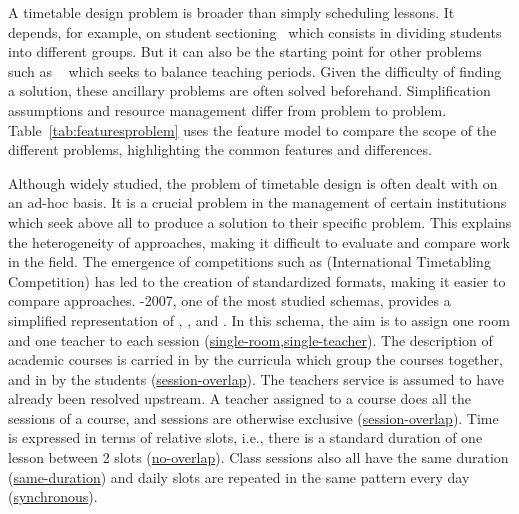 \documentclass[runningheads]{llncs}
\begin{document}
 A timetable design problem is broader than simply scheduling lessons. It depends, for example, on student sectioning~\cite{2017_schindl_AOR,2004_amintoosi_patat} which consists in dividing students into different groups. But it can also be the starting point for other problems such as \BACP{}~\cite{2013_rubio_MPE,2012_chiarandini_JH} which seeks to balance teaching periods. Given the difficulty of finding a solution, these ancillary problems are often solved beforehand. Simplification assumptions and resource management differ from problem to problem.
Table~\ref{tab:featuresproblem} uses the feature model
to compare the scope of the different problems, highlighting the common features and differences. 



Although widely studied, the problem of timetable design is often dealt with on an ad-hoc basis. It is a crucial problem in the management of certain institutions which seek above all to produce a solution to their specific problem. This explains the heterogeneity of approaches, making it difficult to evaluate and compare work in the field.
The emergence of competitions such as \ITC{} (International Timetabling Competition) has led to the creation of standardized formats, making it easier to compare approaches. \ITC{}-2007, one of the most studied schemas, 
provides a simplified representation of \ETT{}, \PETT{}, and \CBTT{}.
In this schema, the aim is to assign one room and one teacher to each session  
(\hyperref[feat:roommodal]{single-room},\hyperref[feat:teachermodal]{single-teacher}).
The description of academic courses is carried in \CBTT{} by the curricula which group the courses together, and in \PETT{} by the students 
(\hyperref[feat:studentsessionoverlap]{session-overlap}).
The teachers service is assumed to have already been resolved upstream. A teacher assigned to a course does all the sessions of a course, and sessions are otherwise exclusive  
(\hyperref[feat:teachersessionoverlap]{session-overlap}).
Time is expressed in terms of relative slots, i.e., there is a standard duration of one lesson between 2 slots 
(\hyperref[feat:nooverlap]{no-overlap}). 
Class sessions also all have the same duration 
(\hyperref[feat:sameduration]{same-duration}) 
and daily slots are repeated in the same pattern every day 
(\hyperref[feat:synchronous]{synchronous}).
\end{document}
